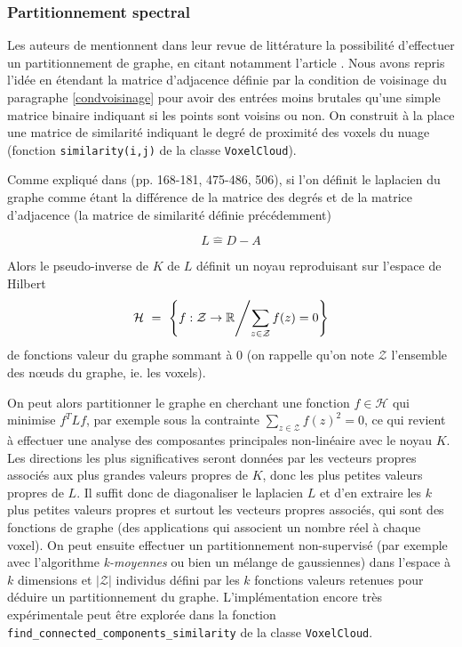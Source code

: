 \documentclass[a4paper, onecolumn, 11pt]{article}
\newcommand{\R}{\mathbb{R}}
\begin{document}
\subsubsection{Partitionnement spectral}
Les auteurs de \cite{aka_article} mentionnent dans leur revue de littérature la possibilité d'effectuer un partitionnement de graphe, en citant notamment l'article \cite{mincut}. Nous avons repris l'idée en étendant la matrice d'adjacence définie par la condition de voisinage du paragraphe \ref{condvoisinage} pour avoir des entrées moins brutales qu'une simple matrice binaire indiquant si les points sont voisins ou non. On construit à la place une matrice de similarité indiquant le degré de proximité des voxels du nuage (fonction \texttt{similarity(i,j)} de la classe \texttt{VoxelCloud}).

Comme expliqué dans \cite{kernels} (pp. 168-181, 475-486, 506), si l'on définit le laplacien du graphe comme étant la différence de la matrice des degrés et de la matrice d'adjacence (la matrice de similarité définie précédemment)

$$L\hat{=}D-A$$

Alors le pseudo-inverse de $K$ de $L$ définit un noyau reproduisant sur l'espace de Hilbert 
$$\mathcal{H}~=~\left\{f:\mathcal{Z}\rightarrow \R \middle/ \sum_{z\in\mathcal{Z}}f(z)=0\right\}$$ de fonctions valeur du graphe sommant à 0 (on rappelle qu'on note $\mathcal{Z}$ l'ensemble des nœuds du graphe, ie. les voxels).

On peut alors partitionner le graphe en cherchant une fonction $f\in\mathcal{H}$ qui minimise $f^TLf$, par exemple sous la contrainte $\sum_{z\in\mathcal{Z}}f(z)^2=0$, ce qui revient à effectuer une analyse des composantes principales non-linéaire avec le noyau $K$. Les directions les plus significatives seront données par les vecteurs propres associés aux plus grandes valeurs propres de $K$, donc les plus petites valeurs propres de $L$. Il suffit donc de diagonaliser le laplacien $L$ et d'en extraire les $k$ plus petites valeurs propres et surtout les vecteurs propres associés, qui sont des fonctions de graphe (des applications qui associent un nombre réel à chaque voxel). On peut ensuite effectuer un partitionnement non-supervisé (par exemple avec l'algorithme \emph{k-moyennes} ou bien un mélange de gaussiennes) dans l'espace à $k$ dimensions et $|\mathcal{Z}|$ individus défini par les $k$ fonctions valeurs retenues pour déduire un partitionnement du graphe. L'implémentation encore très expérimentale peut être explorée dans la fonction \texttt{find\_connected\_components\_similarity} de la classe \texttt{VoxelCloud}.
\end{document}
